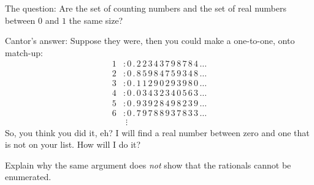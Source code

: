\begin{prob}
The question: Are the set of counting numbers and the set of real
numbers between $0$ and $1$ the same size?

Cantor's answer: Suppose they were, then you could make a one-to-one,
onto match-up:
\begin{align*}
1 &:0\,.\,2\,2\,3\,4\,3\,7\,9\,8\,7\,8\,4\,\dots\\
2 &:0\,.\,8\,5\,9\,8\,4\,7\,5\,9\,3\,4\,8\,\dots\\
3 &:0\,.\,1\,1\,2\,9\,0\,2\,9\,3\,9\,8\,0\,\dots\\
4 &:0\,.\,0\,3\,4\,3\,2\,3\,4\,0\,5\,6\,3\,\dots\\
5 &:0\,.\,9\,3\,9\,2\,8\,4\,9\,8\,2\,3\,9\,\dots\\
6 &:0\,.\,7\,9\,7\,8\,8\,9\,3\,7\,8\,3\,3\,\dots\\
  &\;\vdots
\end{align*}
So, you think you did it, eh?  I will find a real number between zero
and one that is not on your list.  How will I do it?
\end{prob}

\begin{prob}
Explain why the same argument does \textit{not} show that the
rationals cannot be enumerated.
\end{prob}
